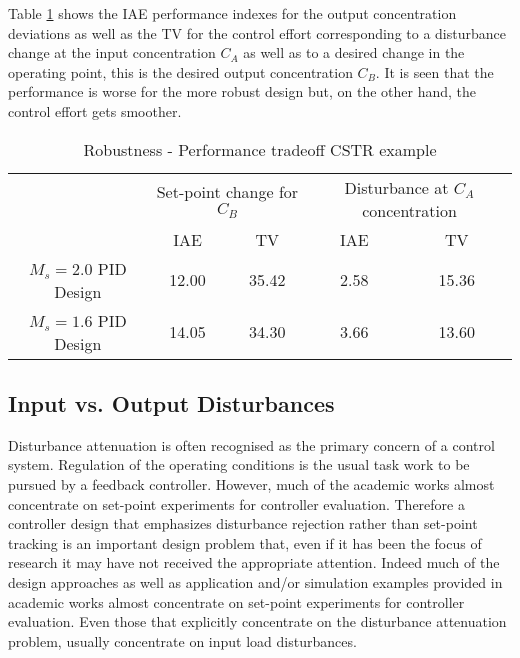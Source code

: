 Table \ref{tab:cstrtradeoff} shows the IAE performance indexes for the output concentration deviations as well as the TV for the control effort corresponding to a disturbance change at the input concentration $C_{A}$ as well as to a desired change in the operating point, this is the desired output concentration $C_B$. It is seen that the performance is worse for the more robust design but, on the other hand, the control effort gets smoother. 

\begin{table}%
\caption{Robustness - Performance tradeoff CSTR example} \label{tab:cstrtradeoff}
\begin{center}
		\begin{small}
    \begin{tabular}{c|cc|cc}
    \hline
    	 & \multicolumn{2}{c|}{Set-point change for $C_B$}  & \multicolumn{2}{c}{Disturbance at $C_A$ concentration}  \\
    		 & IAE & TV & IAE & TV     \\
     \hline
     			$M_s=2.0$ PID Design   & 12.00 & 35.42 & 2.58 & 15.36 \\
     			$M_s=1.6$ PID Design   & 14.05 & 34.30 & 3.66 & 13.60 \\
    \hline
    \end{tabular}
    \end{small}
\end{center}
\end{table}


\subsection{Input vs. Output Disturbances}

Disturbance attenuation is often recognised as the primary concern of a control system. Regulation of the operating conditions is the usual task work to be pursued by a feedback controller. However, much of the academic works almost concentrate on set-point experiments for controller evaluation.  Therefore a controller design that emphasizes disturbance rejection rather than set-point tracking is an important design problem that, even if it has been the focus of research it may have not received the appropriate attention. Indeed much of the design approaches as well as application and/or simulation examples provided in academic works almost concentrate on set-point experiments for controller evaluation. Even those that explicitly concentrate on the disturbance attenuation problem, usually concentrate on input load disturbances.

